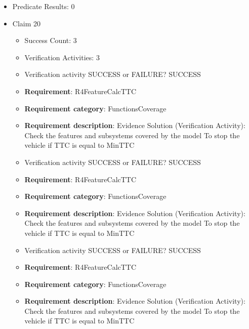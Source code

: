 \documentclass{article}
\begin{document}
\begin{itemize}
\begin{itemize}
					\item Verification activity SUCCESS or FAILURE? SUCCESS
		
						\item \textbf{Requirement}: R3FeatureControlPedal 
						\item \textbf{Requirement category}: FunctionsCoverage 
						\item \textbf{Requirement description}: Evidence Solution (Verification Activity): Check the features and subsystems covered by the model  To prevent collision when obstacle is detected
					
				\end{itemize}
				
									    
				\item Predicate Results: 0

  				  \item Claim 20
				\begin{itemize}
			    	\item Success Count: 3 
			    	\item Verification Activities: 3
					\item Verification activity SUCCESS or FAILURE? SUCCESS
		
						\item \textbf{Requirement}: R4FeatureCalcTTC 
						\item \textbf{Requirement category}: FunctionsCoverage 
						\item \textbf{Requirement description}: Evidence Solution (Verification Activity): Check the features and subsystems covered by the model  To stop the vehicle if TTC is equal to MinTTC
					
					\item Verification activity SUCCESS or FAILURE? SUCCESS
		
						\item \textbf{Requirement}: R4FeatureCalcTTC 
						\item \textbf{Requirement category}: FunctionsCoverage 
						\item \textbf{Requirement description}: Evidence Solution (Verification Activity): Check the features and subsystems covered by the model  To stop the vehicle if TTC is equal to MinTTC
					
					\item Verification activity SUCCESS or FAILURE? SUCCESS
		
						\item \textbf{Requirement}: R4FeatureCalcTTC 
						\item \textbf{Requirement category}: FunctionsCoverage 
						\item \textbf{Requirement description}: Evidence Solution (Verification Activity): Check the features and subsystems covered by the model  To stop the vehicle if TTC is equal to MinTTC
					

\end{itemize}
\end{itemize}
\end{document}
